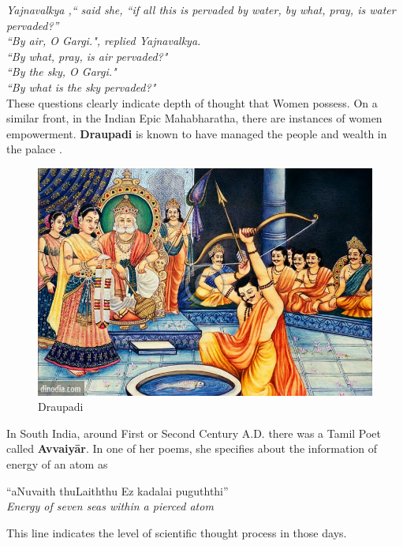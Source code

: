 \documentclass[a4paper,10pt]{article}
\begin{document}
\textit{Yajnavalkya ,`` said she, ``if all this is pervaded by water, by  what, pray, is water pervaded?''} \\
\textit{``By air, O Gargi.", replied Yajnavalkya.} \\
\textit{``By what, pray, is air pervaded?" }\\
\textit{``By the sky, O Gargi."} \\
\textit{``By what is the sky pervaded?"}  \\

These questions clearly indicate depth of thought that Women possess. On a similar front, in the Indian Epic Mahabharatha, there are instances of women empowerment. \textbf{Draupadi} is known to have managed the people and wealth in the palace \cite{mahabharatha}. 

\begin{center}
\begin{figure}[h]
\centering
 \includegraphics[scale=0.2]{draupadi.jpg}
 \caption{Draupadi}
\end{figure}
\end{center}

In South India, around First or Second Century A.D. there was a Tamil Poet called \textbf{Avvaiy\={a}r}. In one of her poems, she specifies about the information of energy of an atom as \\
\begin{center}
``aNuvaith thuLaiththu Ez kadalai puguththi'' \\
\textit{Energy of seven seas within a pierced atom}\\
\end{center}
This line indicates the level of scientific thought process in those days. 
\end{document}
